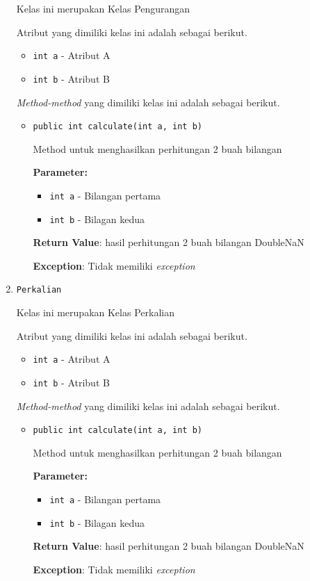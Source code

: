 \documentclass{article}
\begin{document}
\begin{enumerate}
Kelas ini merupakan Kelas Pengurangan

Atribut yang dimiliki kelas ini adalah sebagai berikut.
\begin{itemize}
\item \texttt{int a} - Atribut A
\item \texttt{int b} - Atribut B
\end{itemize}
\textit{Method-method} yang dimiliki kelas ini adalah sebagai berikut.
\begin{itemize}
\item \texttt{public int calculate(int a, int b)}

Method untuk menghasilkan perhitungan 2 buah bilangan

\textbf{Parameter:}
\begin{itemize}
\item \texttt{int a} - 
Bilangan pertama
\item \texttt{int b} - 
Bilagan kedua
\end{itemize}
\textbf{Return Value}: hasil perhitungan 2 buah bilangan  DoubleNaN

\textbf{Exception}: Tidak memiliki \textit{exception}

\end{itemize}
\item \texttt{Perkalian}

Kelas ini merupakan Kelas Perkalian

Atribut yang dimiliki kelas ini adalah sebagai berikut.
\begin{itemize}
\item \texttt{int a} - Atribut A
\item \texttt{int b} - Atribut B
\end{itemize}
\textit{Method-method} yang dimiliki kelas ini adalah sebagai berikut.
\begin{itemize}
\item \texttt{public int calculate(int a, int b)}

Method untuk menghasilkan perhitungan 2 buah bilangan

\textbf{Parameter:}
\begin{itemize}
\item \texttt{int a} - 
Bilangan pertama
\item \texttt{int b} - 
Bilagan kedua
\end{itemize}
\textbf{Return Value}: hasil perhitungan 2 buah bilangan  DoubleNaN

\textbf{Exception}: Tidak memiliki \textit{exception}


\end{itemize}
\end{enumerate}
\end{document}
